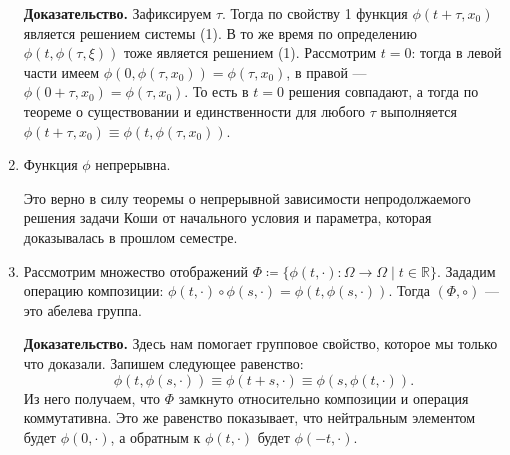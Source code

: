 \begin{enumerate}
        \textbf{Доказательство.} Зафиксируем $\tau$. Тогда по свойству 1 функция $\phi(t + \tau, x_0)$ является решением системы (1).
        В то же время по определению $\phi(t, \phi(\tau, \xi))$ тоже является решением (1).
        Рассмотрим $t = 0$: тогда в левой части имеем $\phi(0, \phi(\tau, x_0)) = \phi(\tau, x_0)$, в правой --- $\phi(0 + \tau, x_0) = \phi(\tau, x_0)$.
        То есть в $t=0$ решения совпадают, а тогда по теореме о существовании и единственности для любого $\tau$ выполняется $\phi(t + \tau, x_0) \equiv \phi(t, \phi(\tau, x_0))$.

        \QED

    \item Функция $\phi$ непрерывна.
    
    Это верно в силу теоремы о непрерывной зависимости непродолжаемого решения задачи Коши от начального условия и параметра, которая доказывалась в прошлом семестре.

    \item Рассмотрим множество отображений $\Phi \coloneq \{\phi(t, \cdot) \colon \Omega \to \Omega \;|\; t \in \mathbb{R}\}$. Зададим операцию композиции: $\phi(t, \cdot) \circ \phi(s, \cdot) = \phi(t, \phi(s, \cdot))$. Тогда $(\Phi, \circ)$ --- это абелева группа.

    \textbf{Доказательство.} Здесь нам помогает групповое свойство, которое мы только что доказали. Запишем следующее равенство: $$\phi(t, \phi(s, \cdot)) \equiv \phi(t + s, \cdot) \equiv \phi(s, \phi(t, \cdot)).$$
    Из него получаем, что $\Phi$ замкнуто относительно композиции и операция коммутативна. Это же равенство показывает, что нейтральным элементом будет $\phi(0, \cdot)$, а обратным к $\phi(t, \cdot)$ будет $\phi(-t, \cdot)$.

    \QED

\end{enumerate}




